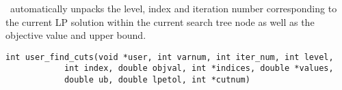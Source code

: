 \item[Note:] \hfill

\BB\ automatically unpacks the level, index and iteration number
corresponding to the current LP solution within the current search tree node
as well as the objective value and upper bound.

\ed

\vspace{1ex}


\label{user_find_cuts}
\begin{verbatim}
int user_find_cuts(void *user, int varnum, int iter_num, int level,
		    int index, double objval, int *indices, double *values,
		    double ub, double lpetol, int *cutnum)
\end{verbatim}

\bd

\describe

